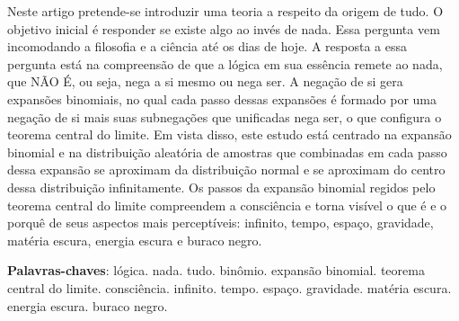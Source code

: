 \maketitle

\begin{resumoumacoluna}
	Neste artigo pretende-se introduzir uma teoria a respeito da origem de tudo. O objetivo inicial é responder se existe algo ao invés de nada. Essa pergunta vem incomodando a filosofia e a ciência até os dias de hoje. A resposta a essa pergunta está na compreensão de que a lógica em sua essência remete ao nada, que NÃO É, ou seja, nega a si mesmo ou nega ser. A negação de si gera expansões binomiais, no qual cada passo dessas expansões é formado por uma negação de si mais suas subnegações que unificadas nega ser, o que configura o teorema central do limite. Em vista disso, este estudo está centrado na expansão binomial e na distribuição aleatória de amostras que combinadas em cada passo dessa expansão se aproximam da distribuição normal e se aproximam do centro dessa distribuição infinitamente. Os passos da expansão binomial regidos pelo teorema central do limite compreendem a consciência e torna visível o que é e o porquê de seus aspectos mais perceptíveis: infinito, tempo, espaço, gravidade, matéria escura, energia escura e buraco negro.
 
 \vspace{\onelineskip}
 
 \noindent
 \textbf{Palavras-chaves}: lógica. nada. tudo. binômio. expansão binomial. teorema central do limite. consciência. infinito. tempo. espaço. gravidade. matéria escura. energia escura. buraco negro.
\end{resumoumacoluna}


